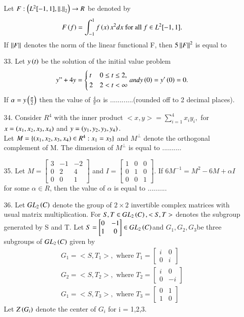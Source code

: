 \documentclass[journal]{IEEEtran}
\begin{document}
\begin{enumerate}
    Let $F:\left(L^2[-1,1],\left\lVert.\right\rVert_2\right)\to R$ be denoted by $$F\left(f\right) = \int_{-1}^{1}f\left(x\right)x^2dx\text{  for all }f\in L^2[-1,1].$$ If $\left\lVert F\right\rVert$ denotes the norm of the linear functional F, then $5\left\lVert F\right\rVert^2$ is equal to 
    \item[33.] Let $y\left(t\right)$ be the solution of the initial value problem $$y"+4y = \begin{cases}t&0\leq t\leq 2,\\2&2<t<\infty \end{cases} and y\left(0\right) = y'\left(0\right) = 0.$$ If $\alpha = y\left(\frac{\pi}{2}\right)$ then the value of $\frac{4}{\pi}\alpha$ is ............(rounded off to 2 decimal places).
    \item[34.] Consider $R^4$ with the inner product $<x,y> = \sum_{i=1}^{4}x_iy_i,$ for $x = \left(x_1, x_2, x_3, x_4\right)$ and $y = \left(y_1, y_2, y_3, y_4\right).$\\Let $M = \{\left(x_1, x_2, x_3, x_4\right)\in R^4 : x_1=x_3\}$ and $M^\bot$ denote the orthogonal complement of M. The dimension of $M^{\bot}$ is equal to .......... 
    \item[35.] Let $M = \begin{bmatrix}3&-1&-2\\0&2&4\\0&0&1\end{bmatrix}$ and $I = \begin{bmatrix}1&0&0\\0&1&0\\0&0&1\end{bmatrix}$. If $6M^{-1} = M^2 - 6M + \alpha I$ for some $\alpha \in R$, then the value of $\alpha$ is equal to .......... 
    \item[36.] Let $GL_2\left(C\right)$ denote the group of $2 \times 2$ invertible complex matrices with usual
    matrix multiplication. For $S, T \in GL_2\left(C\right), < S, T >$ denotes the subgroup generated by S and T. Let $S = \begin{bmatrix}0&-1\\1&0\end{bmatrix} \in GL_2\left(C\right)$and $G_1, G_2, G_3$be three
    subgroups of $GL_2\left(C\right)$ given by\\
    \begin{align*}
        G_1 = <S,T_1>, \text{ where }T_1 = \begin{bmatrix}i&0\\0&i\end{bmatrix} \\
        G_2 = <S,T_2>, \text{ where }T_2 = \begin{bmatrix}i&0\\0&-i\end{bmatrix}\\
        G_1 = <S,T_3>, \text{ where }T_3 = \begin{bmatrix}0&1\\1&0\end{bmatrix}
    \end{align*}
    Let $Z\left(G_i\right)$ denote  the center of $G_i$ for i = 1,2,3.
    

\end{enumerate}
\end{document}
